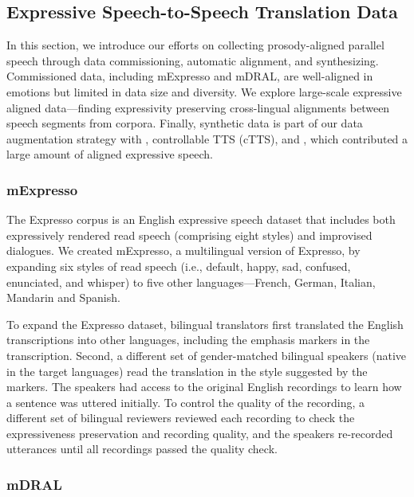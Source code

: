 \subsection{Expressive Speech-to-Speech Translation Data}
\label{sec:expressive_data}
In this section, we introduce our efforts on collecting prosody-aligned parallel speech through data commissioning, automatic alignment, and synthesizing. Commissioned data, including mExpresso and mDRAL, are well-aligned in emotions but limited in data size and diversity. We explore large-scale expressive aligned data—finding expressivity preserving cross-lingual alignments between speech segments from corpora. Finally, synthetic data is part of our data augmentation strategy with \sonar, controllable TTS (cTTS), and \unitvb, which contributed a large amount of aligned expressive speech.




\subsubsection{mExpresso}
\label{subsec:mexpresso}

The Expresso corpus \citep{nguyen2023expresso} is an English expressive speech dataset that includes both expressively rendered read speech (comprising eight styles) and improvised dialogues. We created mExpresso, a multilingual version of Expresso, by expanding six styles of read speech (i.e., default, happy, sad, confused, enunciated, and whisper) to five other languages—French, German, Italian, Mandarin and Spanish. %

To expand the Expresso dataset, bilingual translators first translated the English transcriptions into other languages, including the emphasis markers in the transcription. Second, a different set of gender-matched bilingual speakers (native in the target languages) read the translation in the style suggested by the markers. The speakers had access to the original English recordings to learn how a sentence was uttered initially. To control the quality of the recording, a different set of bilingual reviewers reviewed each recording to check the expressiveness preservation and recording quality, and the speakers re-recorded utterances until all recordings passed the quality check.




\subsubsection{mDRAL}
\label{subsec:mDRAL}



